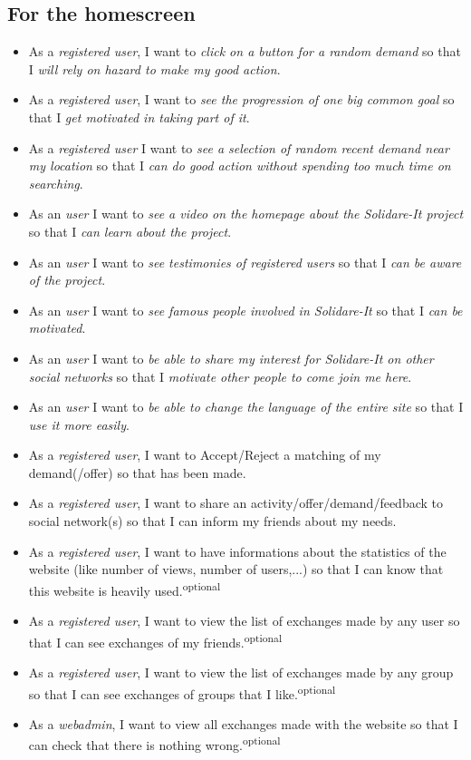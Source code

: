 \subsection{For the homescreen}
\begin{itemize}
    \item As a \textit{registered user}, I want to \textit{click on a button for a random demand} so that I \textit{will rely on hazard to make my good action}.
    \item As a \textit{registered user}, I want to \textit{see the progression of one big common goal} so that I \textit{get motivated in taking part of it}.
    \item As a \emph{registered user} I want to \emph{see a selection of random recent demand near my location} so that I \emph{can do good action without spending too much time on searching}.
    \item As an \emph{user} I want to \emph{see a video on the homepage about the Solidare-It project} so that I \emph{can learn about the project}.
    \item As an \emph{user} I want to \emph{see testimonies of registered users} so that I \emph{can be aware of the project}.
    \item As an \emph{user} I want to \emph{see famous people involved in Solidare-It} so that I \emph{can be motivated}.
    \item As an \textit{user} I want to \textit{be able to share my interest for Solidare-It on other social networks} so that I \textit{motivate other people to come join me here}.
    \item As an \textit{user} I want to \textit{be able to change the language of the entire site} so that I \textit{use it more easily}.
    \item As a \textit{registered user}, I want to Accept/Reject a matching of my demand(/offer) so that has been made.
    \item As a \textit{registered user}, I want to share an activity/offer/demand/feedback to social network(s) so that I can inform my friends about my needs.
    \item As a \textit{registered user}, I want to have informations about the statistics of the website (like number of views, number of users,...) so that I can know that this website is heavily used.\textsuperscript{optional}
    \item As a \textit{registered user}, I want to view the list of exchanges made by any user so that I can see exchanges of my friends.\textsuperscript{optional}
    \item As a \textit{registered user}, I want to view the list of exchanges made by any group so that I can see exchanges of groups that I like.\textsuperscript{optional}
    \item As a \textit{webadmin}, I want to view all exchanges made with the website so that I can check that there is nothing wrong.\textsuperscript{optional}
\end{itemize}

